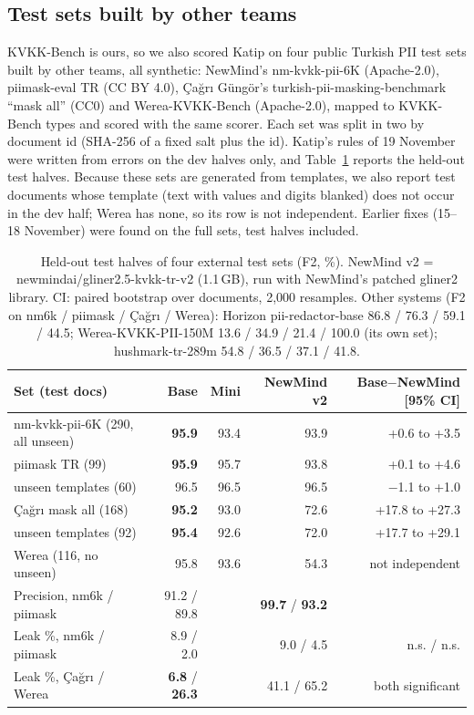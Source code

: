 \documentclass[10pt,twocolumn]{article}
\begin{document}
\subsection{Test sets built by other teams}
\label{sec:external}
KVKK-Bench is ours, so we also scored Katip on four public Turkish PII test sets built by other teams, all
synthetic: NewMind's nm-kvkk-pii-6K (Apache-2.0), piimask-eval TR (CC BY 4.0), \c{C}a\u{g}r\i{} G\"ung\"or's
turkish-pii-masking-benchmark ``mask all'' (CC0) and Werea-KVKK-Bench (Apache-2.0), mapped to KVKK-Bench types and
scored with the same scorer. Each set was split in two by document id (SHA-256 of a fixed salt plus the id).
Katip's rules of 19 November were written from errors on the dev halves only, and Table~\ref{tab:external}
reports the held-out test halves. Because these sets are generated from templates, we also report test documents
whose template (text with values and digits blanked) does not occur in the dev half; Werea has none, so its row is
not independent. Earlier fixes (15--18 November) were found on the full sets, test halves included.

\begin{table}[t]
\centering\footnotesize
\setlength{\tabcolsep}{2.4pt}
\begin{tabular}{@{}lrrrr@{}}
\toprule
Set (test docs) & Base & Mini & NewMind v2 & Base$-$NewMind [95\% CI] \\
\midrule
nm-kvkk-pii-6K (290, all unseen) & \textbf{95.9} & 93.4 & 93.9 & +0.6 to +3.5 \\
piimask TR (99) & \textbf{95.9} & 95.7 & 93.8 & +0.1 to +4.6 \\
\quad unseen templates (60) & 96.5 & 96.5 & 96.5 & $-$1.1 to +1.0 \\
\c{C}a\u{g}r\i{} mask all (168) & \textbf{95.2} & 93.0 & 72.6 & +17.8 to +27.3 \\
\quad unseen templates (92) & \textbf{95.4} & 92.6 & 72.0 & +17.7 to +29.1 \\
Werea (116, no unseen) & 95.8 & 93.6 & 54.3 & not independent \\
\midrule
Precision, nm6k / piimask & 91.2 / 89.8 & & \textbf{99.7} / \textbf{93.2} & \\
Leak \%, nm6k / piimask & 8.9 / 2.0 & & 9.0 / 4.5 & n.s. / n.s. \\
Leak \%, \c{C}a\u{g}r\i{} / Werea & \textbf{6.8} / \textbf{26.3} & & 41.1 / 65.2 & both significant \\
\bottomrule
\end{tabular}
\caption{Held-out test halves of four external test sets (F2, \%). NewMind v2 = newmindai/gliner2.5-kvkk-tr-v2
(1.1\,GB), run with NewMind's patched gliner2 library. CI: paired bootstrap over documents, 2,000 resamples.
Other systems (F2 on nm6k / piimask / \c{C}a\u{g}r\i{} / Werea): Horizon pii-redactor-base 86.8 / 76.3 / 59.1 / 44.5;
Werea-KVKK-PII-150M 13.6 / 34.9 / 21.4 / 100.0 (its own set); hushmark-tr-289m 54.8 / 36.5 / 37.1 / 41.8.}
\label{tab:external}
\end{table}
\end{document}
